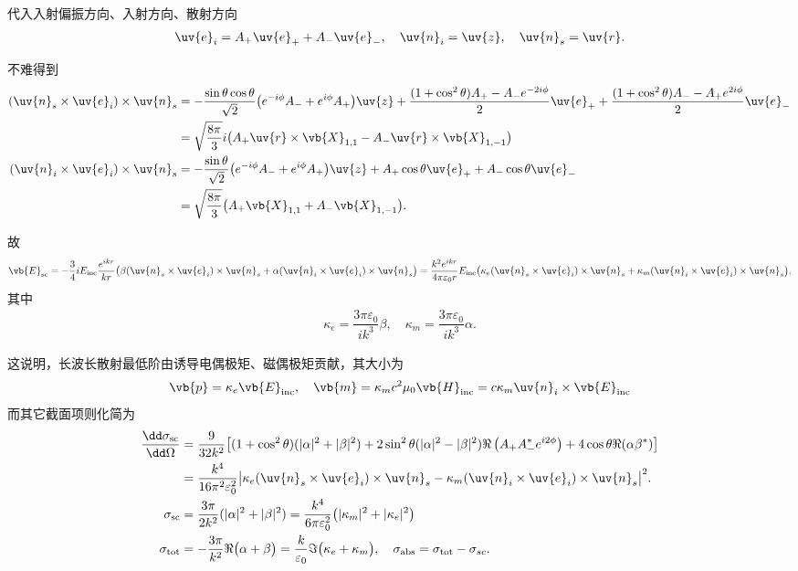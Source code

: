 \begin{exbox}
	代入入射偏振方向、入射方向、散射方向
	\begin{align*}
		\uv{e}_i = A_+\uv{e}_+ + A_-\uv{e}_-,\quad \uv{n}_i = \uv{z},\quad\uv{n}_s = \uv{r}.
	\end{align*}

	不难得到
	\begin{align*}
		(\uv{n}_s\times\uv{e}_i)\times\uv{n}_s &= -\dfrac{\sin\theta \cos\theta}{\sqrt{2}}\bigl(e^{-i\phi}A_- + e^{i\phi}A_+\bigr)\uv{z} +
		\dfrac{(1+\cos^2\theta)A_+ - A_-e^{-2i\phi}}{2}\uv{e}_+ + \dfrac{(1+\cos^2\theta)A_- - A_+e^{2i\phi}}{2}\uv{e}_- \\&=
		\sqrt{\dfrac{8 \pi}{3}}i\bigl(A_+\uv{r}\times\vb{X}_{1,1} - A_-\uv{r}\times\vb{X}_{1,-1}\bigr)\\
		(\uv{n}_i\times\uv{e}_i)\times\uv{n}_s &= -\dfrac{\sin\theta}{\sqrt{2}}\bigl(e^{-i\phi}A_- + e^{i\phi}A_+\bigr)\uv{z} + A_+\cos\theta \uv{e}_+ + A_-\cos\theta \uv{e}_-\\&=
		\sqrt{\dfrac{8 \pi}{3}}\bigl(A_+\vb{X}_{1,1} + A_-\vb{X}_{1,-1}\bigr).
	\end{align*}

	故
	\begin{align*}
		\vb{E}_{\rm sc} = -\dfrac{3}{4}i E_{\rm inc} \dfrac{e^{ikr}}{kr}\bigl(\beta(\uv{n}_s\times\uv{e}_i)\times\uv{n}_s + \alpha(\uv{n}_i\times\uv{e}_i)\times\uv{n}_s\bigr) = \dfrac{k^2 e^{ikr}}{4 \pi\varepsilon_0 r} E_{\rm inc}\bigl(\kappa_e (\uv{n}_s\times\uv{e}_i)\times\uv{n}_s +
		\kappa_m (\uv{n}_i\times\uv{e}_i)\times\uv{n}_s\bigr).
	\end{align*}
	其中
	\begin{align*}
		\kappa_e = \dfrac{3 \pi\varepsilon_0}{i k^3}\beta, \quad \kappa_m = \dfrac{3 \pi\varepsilon_0}{i k^3}\alpha.
	\end{align*}

	这说明，长波长散射最低阶由诱导电偶极矩、磁偶极矩贡献，其大小为
	\begin{align*}
		\vb{p} = \kappa_e \vb{E}_{\rm inc},\quad
		\vb{m} = \kappa_m c^2 \mu_0 \vb{H}_{\rm inc} = c\kappa_m \uv{n}_i\times\vb{E}_{\rm inc}
	\end{align*}
	而其它截面项则化简为
	\begin{align*}
		\frac{\dd \sigma_{\mathrm{sc}}}{\dd \Omega}
		                 & = \frac{9}{32k^2}\!\left[(1+\cos^2\theta)(|\alpha|^2+|\beta|^2) + 2\sin^2\theta(|\alpha|^2-|\beta|^2)\Re\left(A_+A_-^*e^{i2\phi}\right) + 4\cos\theta\Re(\alpha\beta^*)\right] \\
		                 & = \dfrac{k^4}{16 \pi^2 \varepsilon_0^2}\bigl|\kappa_e (\uv{n}_s\times\uv{e}_i)\times\uv{n}_s - \kappa_m (\uv{n}_i\times\uv{e}_i)\times\uv{n}_s\bigr|^2.                        \\
		\sigma_{\mathrm{sc}}
		                 & = \frac{3\pi}{2k^2}(|\alpha|^2+|\beta|^2)=\dfrac{k^4}{6 \pi \varepsilon_0^2}\bigl(|\kappa_m|^2+|\kappa_e|^2\bigr)                                                              \\
		\sigma_{\rm tot} & = -\dfrac{3 \pi}{k^2}\Re\bigl(\alpha+\beta\bigr) = \dfrac{k}{\varepsilon_0}\Im\bigl(\kappa_e+\kappa_m\bigr),\quad
		\sigma_{\rm abs} = \sigma_{\rm tot} - \sigma_{sc}.
	\end{align*}


\end{exbox}
